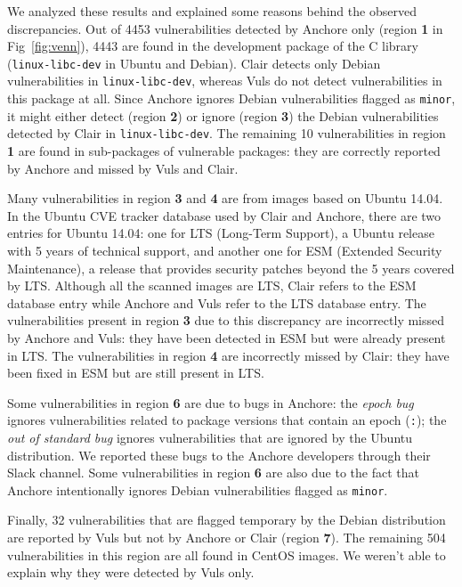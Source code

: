 \documentclass[a4paper,num-refs]{oup-contemporary}
\begin{document}
We analyzed these results and explained some reasons behind the observed
discrepancies. Out of 4453 vulnerabilities detected by Anchore only (region
\textbf{1} in Fig~\ref{fig:venn}), 4443 are found in the development
package of the C library (\texttt{linux-libc-dev} in Ubuntu and Debian).
Clair detects only Debian vulnerabilities in \texttt{linux-libc-dev},
whereas Vuls do not detect vulnerabilities in this package at all. Since Anchore
ignores Debian
vulnerabilities flagged as \texttt{minor}, it
might either detect (region \textbf{2}) or ignore (region \textbf{3})
the
Debian vulnerabilities detected by Clair in \texttt{linux-libc-dev}. The
remaining 10 vulnerabilities in region \textbf{1} are found in sub-packages
of vulnerable packages: they are correctly reported by Anchore and missed
by Vuls and Clair. 

Many vulnerabilities in region \textbf{3} and \textbf{4} are from images
based on Ubuntu 14.04. In the Ubuntu CVE tracker database used by Clair and
Anchore, there are two entries for Ubuntu 14.04: one for LTS (Long-Term
Support), a Ubuntu release with 5 years of technical support, and another one
for ESM (Extended Security Maintenance), a release that provides security
patches beyond the 5 years covered by LTS. Although all the scanned images
are LTS, Clair refers to the ESM database entry while Anchore and Vuls refer to the
LTS database entry. The vulnerabilities present in region \textbf{3} due to
this discrepancy are incorrectly missed by Anchore and Vuls: they have been
detected in ESM but were already present in LTS. The vulnerabilities in
region \textbf{4} are incorrectly missed by Clair: they have been fixed in
ESM but are still present in LTS. 

Some vulnerabilities in region \textbf{6} are due to bugs in Anchore: the
\textit{epoch bug} ignores vulnerabilities related to package versions that
contain an epoch (\texttt{:}); the \textit{out of standard bug} ignores
vulnerabilities that are ignored by the Ubuntu distribution. We reported
these bugs to the Anchore developers through their Slack channel. Some
vulnerabilities in region \textbf{6} are also due to the fact that Anchore
intentionally ignores Debian vulnerabilities flagged as \texttt{minor}.

Finally, 32 vulnerabilities that are flagged temporary by the Debian
distribution are reported by Vuls but not by Anchore or Clair (region
\textbf{7}). The remaining 504 vulnerabilities in this region are all found
in CentOS images. We weren't able to explain why they were detected by Vuls
only.
\end{document}
